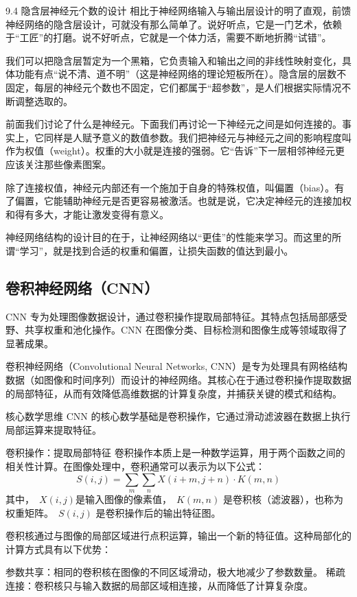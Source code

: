 9.4 隐含层神经元个数的设计
相比于神经网络输入与输出层设计的明了直观，前馈神经网络的隐含层设计，可就没有那么简单了。说好听点，它是一门艺术，依赖于“工匠”的打磨。说不好听点，它就是一个体力活，需要不断地折腾“试错”。

我们可以把隐含层暂定为一个黑箱，它负责输入和输出之间的非线性映射变化，具体功能有点“说不清、道不明”（这是神经网络的理论短板所在）。隐含层的层数不固定，每层的神经元个数也不固定，它们都属于“超参数”，是人们根据实际情况不断调整选取的。

前面我们讨论了什么是神经元。下面我们再讨论一下神经元之间是如何连接的。事实上，它同样是人赋予意义的数值参数。我们把神经元与神经元之间的影响程度叫作为权值（weight）。权重的大小就是连接的强弱。它“告诉”下一层相邻神经元更应该关注那些像素图案。

除了连接权值，神经元内部还有一个施加于自身的特殊权值，叫偏置（bias）。有了偏置，它能辅助神经元是否更容易被激活。也就是说，它决定神经元的连接加权和得有多大，才能让激发变得有意义。

神经网络结构的设计目的在于，让神经网络以“更佳”的性能来学习。而这里的所谓“学习”，就是找到合适的权重和偏置，让损失函数的值达到最小。



\subsection{卷积神经网络（CNN）}
CNN 专为处理图像数据设计，通过卷积操作提取局部特征。其特点包括局部感受野、共享权重和池化操作。CNN 在图像分类、目标检测和图像生成等领域取得了显著成果。


卷积神经网络（Convolutional Neural Networks, CNN）是专为处理具有网格结构数据（如图像和时间序列）而设计的神经网络。其核心在于通过卷积操作提取数据的局部特征，从而有效降低高维数据的计算复杂度，并捕获关键的模式和结构。

核心数学思维
CNN 的核心数学基础是卷积操作，它通过滑动滤波器在数据上执行局部运算来提取特征。

卷积操作：提取局部特征
卷积操作本质上是一种数学运算，用于两个函数之间的相关性计算。在图像处理中，卷积通常可以表示为以下公式：
$$𝑆(𝑖,𝑗)=\sum_{𝑚} \sum_𝑛 𝑋(𝑖+𝑚,𝑗+𝑛)
\cdot 𝐾(𝑚,𝑛)$$
其中，~$X(i,j) $是输入图像的像素值，~$K(m,n)$ 是卷积核（滤波器），也称为权重矩阵。~$S(i,j)$ 是卷积操作后的输出特征图。

卷积核通过与图像的局部区域进行点积运算，输出一个新的特征值。这种局部化的计算方式具有以下优势：

参数共享：相同的卷积核在图像的不同区域滑动，极大地减少了参数数量。
稀疏连接：卷积核只与输入数据的局部区域相连接，从而降低了计算复杂度。

